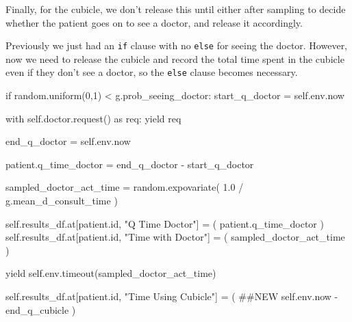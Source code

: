 \documentclass[
  letterpaper,
  DIV=11,
  numbers=noendperiod]{scrreprt}
\newenvironment{Shaded}{}{}
\newcommand{\BuiltInTok}[1]{\textcolor[rgb]{0.84,0.23,0.29}{#1}}
\newcommand{\CommentTok}[1]{\textcolor[rgb]{0.42,0.45,0.49}{#1}}
\newcommand{\ControlFlowTok}[1]{\textcolor[rgb]{0.84,0.23,0.29}{#1}}
\newcommand{\DecValTok}[1]{\textcolor[rgb]{0.00,0.36,0.77}{#1}}
\newcommand{\FloatTok}[1]{\textcolor[rgb]{0.00,0.36,0.77}{#1}}
\newcommand{\ImportTok}[1]{\textcolor[rgb]{0.01,0.18,0.38}{#1}}
\newcommand{\NormalTok}[1]{\textcolor[rgb]{0.14,0.16,0.18}{#1}}
\newcommand{\OperatorTok}[1]{\textcolor[rgb]{0.14,0.16,0.18}{#1}}
\newcommand{\StringTok}[1]{\textcolor[rgb]{0.01,0.18,0.38}{#1}}
\newcommand{\VariableTok}[1]{\textcolor[rgb]{0.89,0.38,0.04}{#1}}
\begin{document}
Finally, for the cubicle, we don't release this until either after
sampling to decide whether the patient goes on to see a doctor, and
release it accordingly.

Previously we just had an \texttt{if} clause with no \texttt{else} for
seeing the doctor. However, now we need to release the cubicle and
record the total time spent in the cubicle even if they don't see a
doctor, so the \texttt{else} clause becomes necessary.

\begin{Shaded}
\begin{Highlighting}[]
\ControlFlowTok{if}\NormalTok{ random.uniform(}\DecValTok{0}\NormalTok{,}\DecValTok{1}\NormalTok{) }\OperatorTok{\textless{}}\NormalTok{ g.prob\_seeing\_doctor:}
\NormalTok{    start\_q\_doctor }\OperatorTok{=} \VariableTok{self}\NormalTok{.env.now}

    \ControlFlowTok{with} \VariableTok{self}\NormalTok{.doctor.request() }\ImportTok{as}\NormalTok{ req:}
        \ControlFlowTok{yield}\NormalTok{ req}

\NormalTok{        end\_q\_doctor }\OperatorTok{=} \VariableTok{self}\NormalTok{.env.now}

\NormalTok{        patient.q\_time\_doctor }\OperatorTok{=}\NormalTok{ end\_q\_doctor }\OperatorTok{{-}}\NormalTok{ start\_q\_doctor}

\NormalTok{        sampled\_doctor\_act\_time }\OperatorTok{=}\NormalTok{ random.expovariate(}
            \FloatTok{1.0} \OperatorTok{/}\NormalTok{ g.mean\_d\_consult\_time}
\NormalTok{        )}

        \VariableTok{self}\NormalTok{.results\_df.at[patient.}\BuiltInTok{id}\NormalTok{, }\StringTok{"Q Time Doctor"}\NormalTok{] }\OperatorTok{=}\NormalTok{ (}
\NormalTok{            patient.q\_time\_doctor}
\NormalTok{        )}
        \VariableTok{self}\NormalTok{.results\_df.at[patient.}\BuiltInTok{id}\NormalTok{, }\StringTok{"Time with Doctor"}\NormalTok{] }\OperatorTok{=}\NormalTok{ (}
\NormalTok{            sampled\_doctor\_act\_time}
\NormalTok{        )}

        \ControlFlowTok{yield} \VariableTok{self}\NormalTok{.env.timeout(sampled\_doctor\_act\_time)}

        \VariableTok{self}\NormalTok{.results\_df.at[patient.}\BuiltInTok{id}\NormalTok{, }\StringTok{"Time Using Cubicle"}\NormalTok{] }\OperatorTok{=}\NormalTok{ ( }\CommentTok{\#\#NEW}
            \VariableTok{self}\NormalTok{.env.now }\OperatorTok{{-}}\NormalTok{ end\_q\_cubicle}
\NormalTok{        )}


\end{Highlighting}
\end{Shaded}
\end{document}
